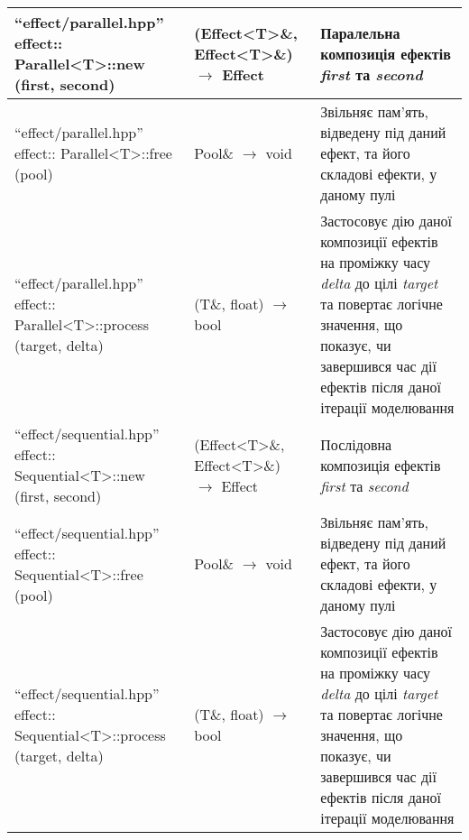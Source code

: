\begin{longtable}{| C{6cm} | C{4cm} | C{5cm} |}
  \hline
  ``effect/parallel.hpp'' \newline effect:: \newline
  Parallel<T>::new \newline (first, second)
  & (Effect<T>\&, Effect<T>\&) $\to$ Effect
  & Паралельна композиція ефектів \emph{first} та \emph{second} \\
  \hline
  ``effect/parallel.hpp'' \newline effect:: \newline
  Parallel<T>::free \newline (pool)
  & Pool\& $\to$ void
  & Звільняє пам'ять, відведену під даний ефект, та його складові ефекти, у даному пулі \\
  \hline
  ``effect/parallel.hpp'' \newline effect:: \newline Parallel<T>::process \newline (target, delta)
  & (T\&, float) $\to$ bool
  & Застосовує дію даної композиції ефектів на проміжку часу \emph{delta}
  до цілі \emph{target} та повертає логічне значення, що показує,
  чи завершився час дії ефектів після даної ітерації моделювання \\

  \hline
  ``effect/sequential.hpp'' \newline effect:: \newline
  Sequential<T>::new \newline (first, second)
  & (Effect<T>\&, Effect<T>\&) $\to$ Effect
  & Послідовна композиція ефектів \emph{first} та \emph{second} \\
  \hline
  ``effect/sequential.hpp'' \newline effect:: \newline
  Sequential<T>::free \newline (pool)
  & Pool\& $\to$ void
  & Звільняє пам'ять, відведену під даний ефект, та його складові ефекти, у даному пулі \\
  \hline
  ``effect/sequential.hpp'' \newline effect:: \newline Sequential<T>::process \newline (target, delta)
  & (T\&, float) $\to$ bool
  & Застосовує дію даної композиції ефектів на проміжку часу \emph{delta}
  до цілі \emph{target} та повертає логічне значення, що показує,
  чи завершився час дії ефектів після даної ітерації моделювання \\


\end{longtable}
